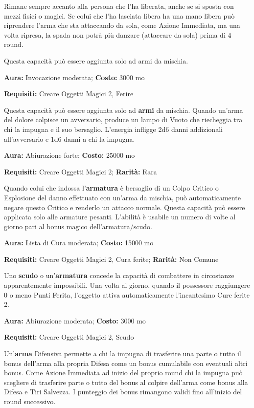 \begin{multicols}{2}
Rimane sempre accanto alla persona che l'ha liberata, anche se si sposta con mezzi fisici o magici. Se colui che l'ha lasciata libera ha una mano libera può riprendere l'arma che sta attaccando da sola, come Azione Immediata, ma una volta ripresa, la spada non potrà più danzare (attaccare da sola) prima di 4 round.

Questa capacità può essere aggiunta solo ad armi da mischia.


\textbf{Aura:} Invocazione moderata; \textbf{Costo:} 3000 mo

\textbf{Requisiti:} Creare Oggetti Magici 2, Ferire

Questa capacità può essere aggiunta solo ad \textbf{armi} da mischia. Quando un'arma del dolore colpisce un avversario, produce un lampo di Vuoto che riecheggia tra chi la impugna e il suo bersaglio. L'energia infligge 2d6 danni addizionali all'avversario e 1d6 danni a chi la impugna.


\textbf{Aura:} Abiurazione forte; \textbf{Costo:} 25000 mo

\textbf{Requisiti:} Creare Oggetti Magici 2; \textbf{Rarità:} Rara

Quando colui che indossa l'\textbf{armatura} è bersaglio di un Colpo Critico o Esplosione del danno effettuato con un'arma da mischia, può automaticamente negare questo Critico e renderlo un attacco normale. Questa capacità può essere applicata solo alle armature pesanti. L'abilità è usabile un numero di volte al giorno pari al bonus magico dell'armatura/scudo.


\textbf{Aura:} Lista di Cura moderata; \textbf{Costo:} 15000 mo

\textbf{Requisiti:} Creare Oggetti Magici 2, Cura ferite; \textbf{Rarità:} Non Comune

Uno \textbf{scudo} o un'\textbf{armatura} concede la capacità di combattere in circostanze apparentemente impossibili. Una volta al giorno, quando il possessore raggiungere 0 o meno Punti Ferita, l'oggetto attiva automaticamente l'incantesimo Cure ferite 2.


\textbf{Aura:} Abiurazione moderata; \textbf{Costo:} 3000 mo

\textbf{Requisiti:} Creare Oggetti Magici 2, Scudo

Un'\textbf{arma} Difensiva permette a chi la impugna di trasferire una parte o tutto il bonus dell'arma alla propria Difesa come un bonus cumulabile con eventuali altri bonus. Come Azione Immediata ad inizio del proprio round chi la impugna può scegliere di trasferire parte o tutto del bonus al colpire dell'arma come bonus alla Difesa e Tiri Salvezza. I punteggio dei bonus rimangono validi fino all'inizio del round successivo.


\end{multicols}
